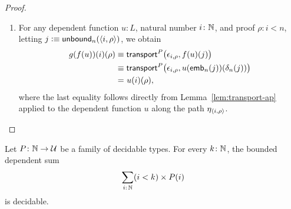 \begin{proof}
\begin{enumerate}[-]
\begin{equation}
            \epsilon_{\fun{emb}_n(j),\delta_n(j)}
            \eq{}
            \fun{ap}_{\fun{emb}_n}(\vartheta_j).
        \end{equation}
        Then,
        \begin{align*}
            f(g(v))(j)
                &\equiv g(v)(\fun{emb}_n(j))(\delta_n(j))\\
                &\equiv\fun{transport}^P\bigl(
                    \epsilon_{\fun{emb}_n(j),\delta_n(j)},
                    v(\fun{unbound}_n(\fun{bound}_n(j)))
                \bigr)\\
                &\eq{}\fun{transport}^P\bigl(
                    \fun{ap}_{\fun{emb}_n}(\vartheta_j),
                    v(\fun{unbound}_n(\fun{bound}_n(j)))
                \bigr)
                    &&\text{; \eqref{eq:epsilon=ap}}\\
                &\eq{}v(j),
        \end{align*}
        where the final equality follows directly from Lemma~\ref{lem:transport-ap} applied to the dependent function $v$ along the path $\vartheta_j$.
        
        \item For any dependent function $u\colon L$, natural number $i\colon\N$, and proof $\rho\colon i<n$, letting $j\mathrel{\vcentcolon}\equiv\mathsf{unbound}_n(\langle i,\rho\rangle)$, we obtain
        \begin{align*}
            g(f(u))(i)(\rho)
                &\equiv\mathsf{transport}^P\bigl(
                    \epsilon_{i,\rho},
                    f(u)(j)
                \bigr)\\
                &\equiv\mathsf{transport}^P\bigl(
                    \epsilon_{i,\rho},
                    u(\mathsf{emb}_n(j))(\delta_n(j))
                \bigr)\\
                &\mathrel{=_{}}u(i)(\rho),
        \end{align*}
        where the last equality follows directly from Lemma~\ref{lem:transport-ap} applied to the dependent function $u$ along the path $\eta_{\langle i,\rho\rangle}$.
    \end{enumerate}
\end{proof}

\begin{thm}\label{thm:domain-bounded-sums-are-decidable}
    Let\/ $P\colon\N\to\univ$ be a family of decidable types. For every\/ $k\colon\N$, the bounded dependent sum
    \[
        \sum_{i\colon\N}(i<k)\times P(i)
    \]
    is decidable.
\end{thm}


